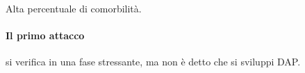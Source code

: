 
Alta percentuale di comorbilità.
\paragraph{Il primo attacco} si verifica in una fase stressante, ma non è detto che si sviluppi DAP.
